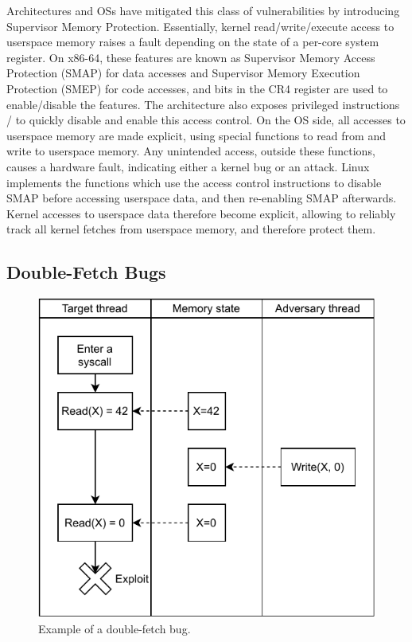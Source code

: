 \documentclass[letterpaper,twocolumn,10pt]{article}
\begin{document}
Architectures and OSs have mitigated this class of vulnerabilities
by introducing Supervisor Memory Protection.
Essentially, kernel read/write/execute access to userspace memory
raises a fault depending on the state of a per-core system 
register.
On x86-64, these features are known as Supervisor Memory Access 
Protection (SMAP) for data accesses and Supervisor Memory Execution 
Protection (SMEP) for code accesses, and bits in the CR4 register 
are used to enable/disable the features.
The architecture also exposes privileged instructions 
/ to quickly disable and enable this access 
control.
On the OS side, all accesses to userspace memory are made explicit, 
using special functions to read from and write to userspace memory.
Any unintended access, outside these functions, causes a 
hardware fault, indicating either a kernel bug or an attack.
Linux implements the functions  which 
use the access control instructions to disable SMAP before 
accessing userspace data, and then re-enabling SMAP afterwards.
Kernel accesses to userspace data therefore become explicit, allowing
\tiktok to reliably track all kernel fetches from userspace memory, 
and therefore protect them.


\subsection{Double-Fetch Bugs}

\begin{figure}[]
  \centering
  \includegraphics[width=.8\linewidth]{img/doublefetch.pdf}
  \caption{Example of a double-fetch bug.}
  \label{fig:doublefetch}
\end{figure}
\end{document}
